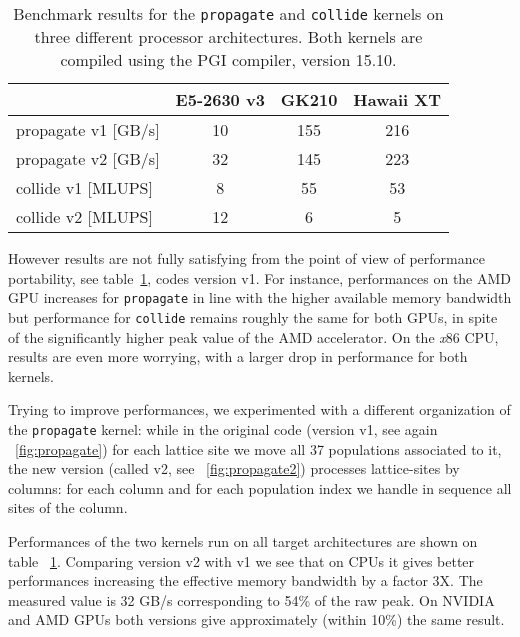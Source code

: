 \documentclass[times]{cpeauth}
\begin{document}
%
\begin{table}[b]
\centering
\caption{Benchmark results for the {\tt propagate} and {\tt collide} kernels 
on three different processor architectures. Both kernels are compiled 
using the PGI compiler, version 15.10.}
\label{tab:benchmark}
\begin{tabular}{l c c c}
\toprule
                       & E5-2630 v3 & GK210      & Hawaii XT  \\
\midrule
propagate v1 [GB/s]    &    10      & 155        & 216        \\
propagate v2 [GB/s]    &    32      & 145        & 223        \\
\midrule
collide v1 [MLUPS]     &     8      & 55         & 53         \\
collide v2 [MLUPS]     &    12      &  6         &  5         \\
\bottomrule
\end{tabular}
\end{table}
%
  
However results are not fully satisfying from the point of view of performance 
portability, see table~\ref{tab:benchmark}, codes version v1. 
%
For instance, performances on the AMD GPU increases for {\tt propagate} 
in line with the higher available memory bandwidth but performance for 
{\tt collide} remains roughly the same for both GPUs, in spite of the 
significantly higher peak value of the AMD accelerator. 
%
On the {\em x}86 CPU, results are even more worrying, with a larger 
drop in performance for both kernels. 

Trying to improve performances, we experimented with a different organization 
of the {\tt propagate} kernel: while in the original code 
(version v1, see again \figurename~\ref{fig:propagate})  
for each lattice site we move all 37 populations associated to it, 
the new version (called v2, see \figurename~\ref{fig:propagate2}) 
processes lattice-sites by columns: for each column and for each population 
index we handle in sequence all sites of the column. 

Performances of the two kernels run on all target architectures 
are shown on table \tablename~\ref{tab:benchmark}. 
%
Comparing version v2 with v1 we see that on CPUs it gives better performances  
increasing the effective memory bandwidth by a factor 3X. The measured value is 
32 GB/s corresponding to 54\% of the raw peak. On NVIDIA and AMD GPUs both 
versions give approximately (within 10\%) the same result. 
\end{document}
